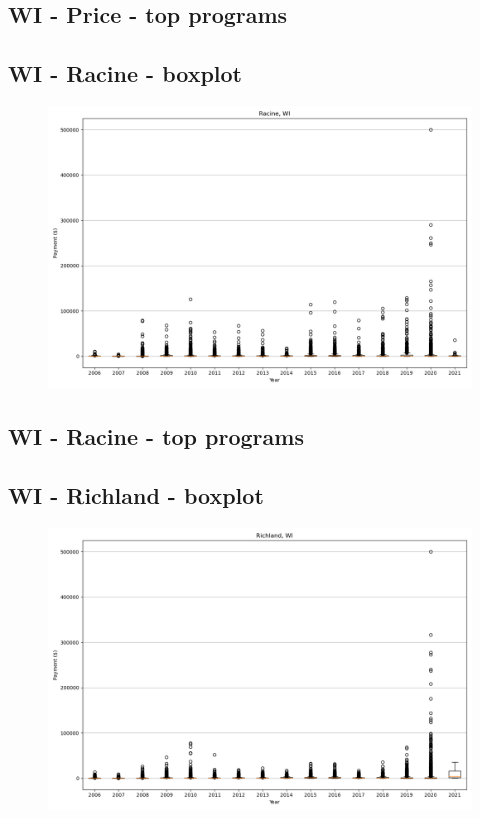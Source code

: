 \subsection*{WI - Price - top programs}

\newpage
\subsection*{WI - Racine - boxplot}
\begin{figure}[h]
\centering
\includegraphics[width=7in]{../output/boxplots/counties/Racine-WI_boxplot.png}
\end{figure}


\subsection*{WI - Racine - top programs}

\newpage
\subsection*{WI - Richland - boxplot}
\begin{figure}[h]
\centering
\includegraphics[width=7in]{../output/boxplots/counties/Richland-WI_boxplot.png}
\end{figure}


